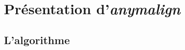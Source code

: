 \documentclass[a4paper,10pt]{article}
\begin{document}




\section{Présentation d'\emph{anymalign}}

\subsection{L'algorithme}

%


\end{document}
